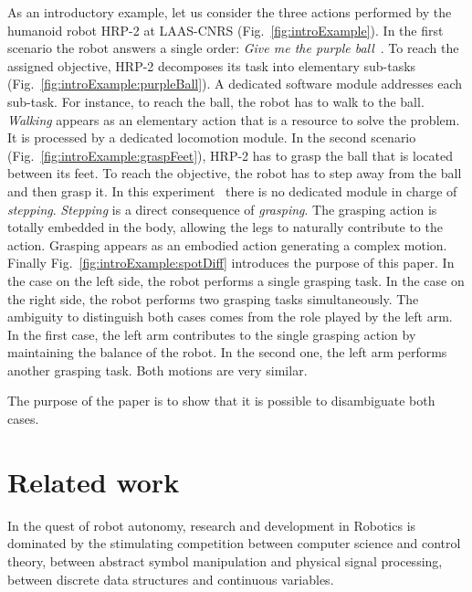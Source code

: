 \documentclass[letterpaper, 10pt, conference]{ieeeconf}      %
\begin{document}
As an introductory example, let us consider the three actions performed by the
humanoid robot HRP-2 at LAAS-CNRS (Fig.~\ref{fig:introExample}). In the first scenario the robot
answers a single order: \emph{Give me the purple ball}~\cite{yoshida07}. To reach the assigned
objective, HRP-2 decomposes its task into elementary sub-tasks
(Fig.~\ref{fig:introExample:purpleBall}). A dedicated software module addresses each
sub-task. For instance,
to reach the ball, the robot has to walk to the ball. \emph{Walking} appears as an
elementary action that is a resource to solve the problem. It is processed by a
dedicated locomotion module. In the second scenario (Fig.~\ref{fig:introExample:graspFeet}),
HRP-2 has to grasp the ball that is located between its feet. To reach the
objective, the robot has to step away from the ball and then grasp it. In this
experiment~\cite{kanoun} there is no dedicated module in charge of \emph{stepping}. \emph{Stepping} is
a direct consequence of \emph{grasping}. The grasping action is totally embedded in
the body, allowing the legs to naturally contribute to the action. Grasping
appears as an embodied action generating a complex motion. Finally Fig.~\ref{fig:introExample:spotDiff}
introduces the purpose of this paper. In the case on the left side, the robot
performs a single grasping task. In the case on the right side, the robot
performs two grasping tasks simultaneously. The ambiguity to distinguish both
cases comes from the role played by the left arm. In the first case, the left
arm contributes to the single grasping action by maintaining the balance of the
robot. In the second one, the left arm performs another grasping task. Both
motions are very similar. 

The purpose of the paper is to show that it is possible to disambiguate both
cases.

\section{Related work}
In the quest of robot autonomy, research and development in Robotics is
dominated by the stimulating competition between computer science and
control theory, between abstract symbol manipulation and physical signal
processing, between discrete data structures and continuous variables.\\
\end{document}
